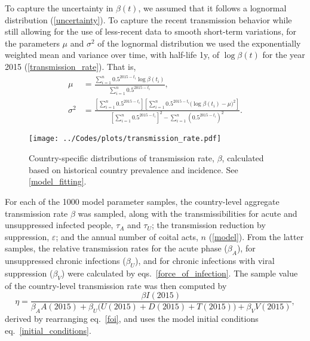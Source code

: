 \documentclass{article}
\begin{document}
To capture the uncertainty in $\beta(t)$, we assumed that it follows a
lognormal distribution (\autoref{uncertainty}).  To capture the recent
transmission behavior while still allowing for the use of less-recent
data to smooth short-term variations, for the parameters $\mu$ and
$\sigma^2$ of the lognormal distribution we used the exponentially
weighted mean and variance \cite{holt2004} over time, with half-life
1\;y, of $\log \beta(t)$ for the year 2015
(\autoref{transmission_rate}).  That is,
\begin{equation}
  \begin{split}
    \mu &= \frac{\sum_{i = 1}^n  0.5^{2015 - t_i} \log \beta(t_i)}
    {\sum_{i = 1}^n 0.5^{2015 - t_i}},
    \\
    \sigma^2 &= \frac{\left[\sum_{i = 1}^n 0.5^{2015 - t_i}\right]
      \left[\sum_{i = 1}^n  0.5^{2015 - t_i}
        \big(\log \beta(t_i) - \mu\big)^2\right]}
    {\left[\sum_{i = 1}^n 0.5^{2015 - t_i}\right]^2
      - \sum_{i = 1}^n \left(0.5^{2015 - t_i}\right)^2}.
  \end{split}
\end{equation}

\begin{figure}
  \centering
  \texttt{[image: ../Codes/plots/transmission\_rate.pdf]}
  \caption{Country-specific distributions of transmission rate,
    $\beta$, calculated based on historical country prevalence and
    incidence.  See \autoref{model_fitting}.}
  \label{transmission_rate}
\end{figure}

For each of the 1000 model parameter samples, the country-level
aggregate transmission rate $\beta$ was sampled, along with the
transmissibilities for acute and unsuppressed infected people,
$\tau_A$ and $\tau_U$; the transmission reduction by suppression,
$\varepsilon$; and the annual number of coital acts, $n$
(\autoref{model}).  From the latter samples, the relative transmission
rates for the acute phase ($\beta_A$), for unsuppressed chronic
infections ($\beta_U$), and for chronic infections with viral
suppression ($\beta_V$) were calculated by
eqs.~\eqref{force_of_infection}.  The sample value of the
country-level transmission rate was then computed by
\begin{equation}
  \label{eta}
  \eta = \frac{\beta I(2015)}{
    \beta_A A(2015) + \beta_U \big(U(2015) + D(2015) + T(2015)\big)
    + \beta_V V(2015)},
\end{equation}
derived by rearranging eq.~\eqref{foi}, and uses the model initial
conditions eq.~\eqref{initial_conditions}.
\end{document}
